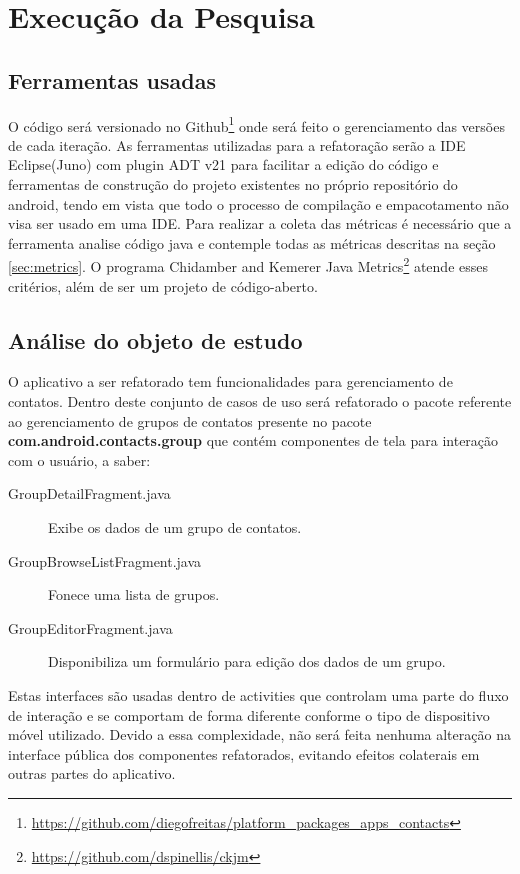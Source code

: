 \chapter{Execução da Pesquisa}


\section{Ferramentas usadas}

O código será versionado no
Github\footnote{\url{https://github.com/diegofreitas/platform_packages_apps_contacts}}
onde será feito o gerenciamento das versões de cada iteração.
As ferramentas utilizadas para a refatoração serão a IDE Eclipse(Juno) com
plugin ADT v21 para facilitar a edição do código e ferramentas de construção
do projeto existentes no próprio repositório do android, tendo em vista que todo
o processo de compilação e empacotamento não visa ser usado em uma IDE.
Para realizar a coleta das métricas é necessário que a ferramenta analise código
java e contemple todas as métricas descritas na seção \ref{sec:metrics}. O
programa Chidamber and Kemerer Java
Metrics\footnote{\url{https://github.com/dspinellis/ckjm}} atende esses
critérios, além de ser um projeto de código-aberto.

\section{Análise do objeto de estudo}

O aplicativo a ser refatorado tem funcionalidades para gerenciamento de
contatos. Dentro deste conjunto de casos de uso será refatorado o pacote
referente ao gerenciamento de grupos de contatos presente no pacote
\textbf{com.android.contacts.group} que contém componentes de tela para
interação com o usuário, a saber:
\begin{description}
\item[GroupDetailFragment.java] Exibe os dados de um grupo de contatos.
\item[GroupBrowseListFragment.java] Fonece uma lista de grupos.
\item[GroupEditorFragment.java] Disponibiliza um formulário para edição dos
dados de um grupo.
\end{description}

Estas interfaces são usadas dentro de activities que controlam uma parte do fluxo
de interação e se comportam de forma diferente conforme o tipo de dispositivo
móvel utilizado. Devido a essa complexidade, não será feita nenhuma alteração na
interface pública dos componentes refatorados, evitando efeitos colaterais em
outras partes do aplicativo.

